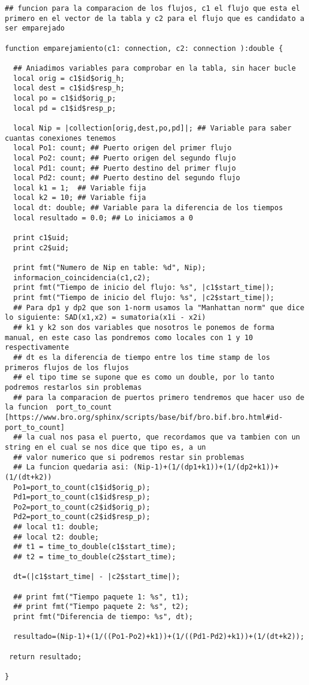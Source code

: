 \begin{lstlisting}[style=CodigoC]
## funcion para la comparacion de los flujos, c1 el flujo que esta el primero en el vector de la tabla y c2 para el flujo que es candidato a ser emparejado

function emparejamiento(c1: connection, c2: connection ):double {

  ## Aniadimos variables para comprobar en la tabla, sin hacer bucle
  local orig = c1$id$orig_h;
  local dest = c1$id$resp_h;
  local po = c1$id$orig_p;
  local pd = c1$id$resp_p;

  local Nip = |collection[orig,dest,po,pd]|; ## Variable para saber cuantas conexiones tenemos
  local Po1: count; ## Puerto origen del primer flujo
  local Po2: count; ## Puerto origen del segundo flujo
  local Pd1: count; ## Puerto destino del primer flujo
  local Pd2: count; ## Puerto destino del segundo flujo
  local k1 = 1;  ## Variable fija
  local k2 = 10; ## Variable fija
  local dt: double; ## Variable para la diferencia de los tiempos
  local resultado = 0.0; ## Lo iniciamos a 0
  
  print c1$uid;
  print c2$uid;

  print fmt("Numero de Nip en table: %d", Nip);
  informacion_coincidencia(c1,c2);
  print fmt("Tiempo de inicio del flujo: %s", |c1$start_time|);
  print fmt("Tiempo de inicio del flujo: %s", |c2$start_time|);
  ## Para dp1 y dp2 que son 1-norm usamos la "Manhattan norm" que dice lo siguiente: SAD(x1,x2) = sumatoria(x1i - x2i)
  ## k1 y k2 son dos variables que nosotros le ponemos de forma manual, en este caso las pondremos como locales con 1 y 10 respectivamente
  ## dt es la diferencia de tiempo entre los time stamp de los primeros flujos de los flujos
  ## el tipo time se supone que es como un double, por lo tanto podremos restarlos sin problemas
  ## para la comparacion de puertos primero tendremos que hacer uso de la funcion  port_to_count [https://www.bro.org/sphinx/scripts/base/bif/bro.bif.bro.html#id-port_to_count]
  ## la cual nos pasa el puerto, que recordamos que va tambien con un string en el cual se nos dice que tipo es, a un
  ## valor numerico que si podremos restar sin problemas
  ## La funcion quedaria asi: (Nip-1)+(1/(dp1+k1))+(1/(dp2+k1))+(1/(dt+k2))
  Po1=port_to_count(c1$id$orig_p);
  Pd1=port_to_count(c1$id$resp_p);
  Po2=port_to_count(c2$id$orig_p);
  Pd2=port_to_count(c2$id$resp_p);
  ## local t1: double;
  ## local t2: double;
  ## t1 = time_to_double(c1$start_time);
  ## t2 = time_to_double(c2$start_time);

  dt=(|c1$start_time| - |c2$start_time|);

  ## print fmt("Tiempo paquete 1: %s", t1);
  ## print fmt("Tiempo paquete 2: %s", t2);
  print fmt("Diferencia de tiempo: %s", dt);

  resultado=(Nip-1)+(1/((Po1-Po2)+k1))+(1/((Pd1-Pd2)+k1))+(1/(dt+k2));

 return resultado;

}
\end{lstlisting}

